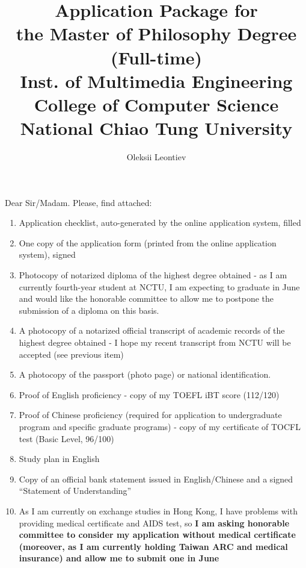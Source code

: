 \documentclass[8pt]{article} %
\title{Application Package for\\the Master of Philosophy Degree (Full-time)\\Inst. of Multimedia Engineering
 \\College of Computer Science\\National Chiao Tung University}
\author{Oleksii Leontiev}
\begin{document}
\begin{CJK}{UTF8}{bsmi}
\maketitle
\end{CJK}

Dear Sir/Madam. Please, find attached:
\begin{enumerate}
\item{Application checklist, auto-generated by the online application system, filled}%
\item{One copy of the application form (printed from the online application system), signed}%
\item{Photocopy of notarized diploma of the highest degree obtained - as I am currently fourth-year student at NCTU, I am expecting to graduate in June and would
like the honorable committee to allow me to postpone the submission of a diploma on this basis.}
\item{A photocopy of a notarized official transcript of academic records of the highest degree obtained - I hope my recent transcript from NCTU will be accepted (see
previous item)}
\item{A photocopy of the passport (photo page) or national identification.}
\item{Proof of English proficiency - copy of my TOEFL iBT score (112/120)}
\item{Proof of Chinese proficiency (required for application to undergraduate program and specific graduate programs) - copy of my certificate of TOCFL test
 (Basic Level, 96/100)}
\item{Study plan in English}
\item{Copy of an official bank statement issued in English/Chinese and a signed “Statement of Understanding”}%
\item{As I am currently on exchange studies in Hong Kong, I have problems with providing medical certificate and AIDS test, so \textbf{I am asking honorable committee
to consider my application without medical certificate (moreover, as I am currently holding Taiwan ARC and medical insurance) and allow me to submit one in June}}
\end{enumerate}
\end{document}
